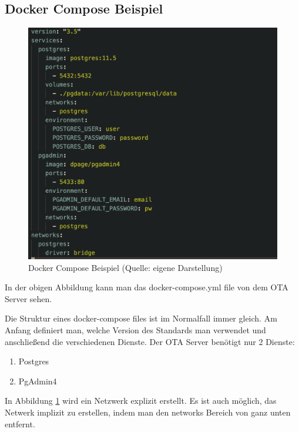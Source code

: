 \subsection{Docker Compose Beispiel}

\begin{figure}[H]
    \begin{center}
        \includegraphics[scale=0.8]{images/docker_compose_example.png}
        \caption{Docker Compose Beispiel (Quelle: eigene Darstellung)}
        \label{abb:docker-compose-example}
    \end{center}
\end{figure}

In der obigen Abbildung kann man das docker-compose.yml file von dem OTA Server sehen.

Die Struktur eines docker-compose files ist im Normalfall immer gleich. Am Anfang definiert man, welche Version des Standards man verwendet und anschließend die verschiedenen Dienste. Der OTA Server benötigt nur 2 Dienste:

\begin{enumerate}
    \item Postgres
    \item PgAdmin4
\end{enumerate}

In Abbildung \ref{abb:docker-compose-example} wird ein Netzwerk explizit erstellt. Es ist auch möglich, das Netwerk implizit zu erstellen, indem man den networks Bereich von ganz unten entfernt.

